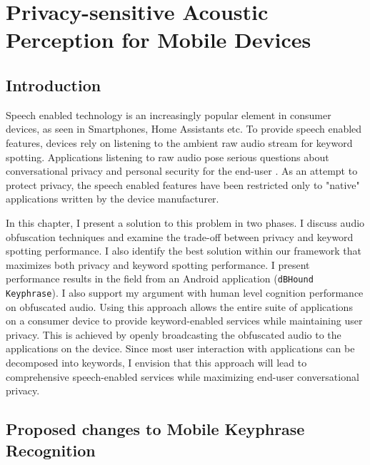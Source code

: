 \chapter{Privacy-sensitive Acoustic Perception for Mobile Devices}
\label{chap:sound}

\section{Introduction}

Speech enabled technology is an increasingly popular element in consumer devices, as seen in Smartphones, Home Assistants etc.
 To provide speech enabled features, devices rely on listening to the ambient raw audio stream for keyword spotting.
 Applications listening to raw audio pose serious questions about conversational privacy and personal security for the end-user \cite{alwaysListening}.
 As an attempt to protect privacy, the speech enabled features have been restricted only to "native" applications written by the device manufacturer.


In this chapter, I present a solution to this problem in two phases.
 I discuss audio obfuscation techniques and examine the trade-off between privacy and keyword spotting performance.
 I also identify the best solution within our framework that maximizes both privacy and keyword spotting performance.
 I present performance results in the field from an Android application (\texttt{dBHound Keyphrase}).
 I also support my argument with human level cognition performance on obfuscated audio.
 Using this approach allows the entire suite of applications on a consumer device to provide keyword-enabled services while maintaining user privacy.
 This is achieved by openly broadcasting the obfuscated audio to the applications on the device.
 Since most user interaction with applications can be decomposed into keywords, I envision that this approach will lead to comprehensive speech-enabled services while maximizing end-user conversational privacy.












\section{Proposed changes to Mobile Keyphrase Recognition}
\label{sec:proposed_changes_to_mobile}

